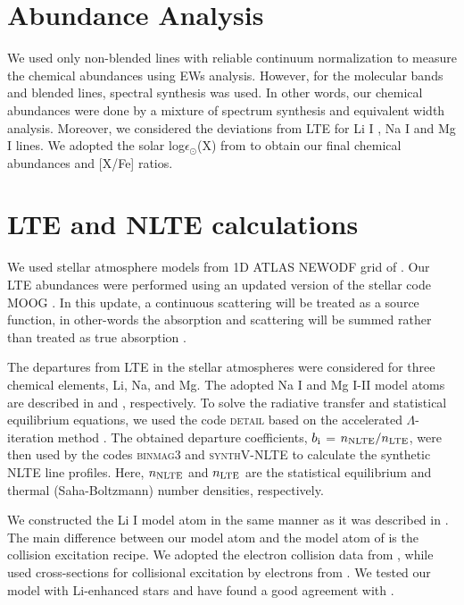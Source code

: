 \section{Abundance Analysis}
\label{sect:Method}

We used only non-blended lines with reliable continuum normalization to measure the chemical abundances using EWs analysis.
However, for the molecular bands and blended lines, spectral synthesis was used. 
In other words, our chemical abundances were done by a mixture of spectrum synthesis 
and equivalent width analysis. 
Moreover,  we considered the deviations from LTE for Li I , Na I and Mg I lines. 
We adopted the solar log$\epsilon_\odot$(X) from \citet{2009ARAA..47..481A} to obtain our final chemical abundances and [X/Fe] ratios.


\section{LTE and NLTE calculations}

We used stellar atmosphere models from 1D ATLAS NEWODF grid of \citet{2003IAUS..210P.A20C}.
Our LTE abundances were performed using an updated version of the stellar code MOOG \citep{1973PhDT.......180S}.
In this update, a continuous scattering will be treated as a source function, in other-words the absorption and scattering
will be summed rather than treated as true absorption \citep{2011AJ....141..175S}.

The departures from LTE in the stellar atmospheres were considered for three chemical elements, Li, Na, and Mg. 
The adopted Na I and Mg I-II model atoms are described in \citet{2014AstL...40..406A} and \citet{2018arXiv180906969A}, respectively.
To solve the radiative transfer and statistical equilibrium equations, we used the code \textsc{detail} \citep{detail} based on the accelerated
 $\Lambda$-iteration method \citep{rh91}. The obtained departure coefficients, $b_{\rm{i}}$ = $n_{\rm{NLTE}} / n_{\rm{LTE}}$, were then 
 used by the codes \textsc{binmag3} \citep{binmag3} and \textsc{synthV-NLTE} \citep{2016MNRAS.456.1221R} to calculate the synthetic NLTE line profiles. 
Here, $n_{\rm{NLTE}}$ and $n_{\rm{LTE}}$ are the statistical equilibrium and thermal (Saha-Boltzmann) number densities, respectively. 

We constructed the Li  I model atom in the same manner as it was described in \citet{2009A&A...503..541L}. 
The main difference between our model atom and the model atom of \citet{2009A&A...503..541L} is the collision excitation recipe. 
We adopted the electron collision data from \citet{2011A&A...529A..31O}, while 
\citet{2009A&A...503..541L} used cross-sections for collisional excitation by electrons from \citet{1971JQSRT..11....7P}. 
We tested our model with Li-enhanced stars and have found a good agreement with \citet{2009A&A...503..541L}. 
